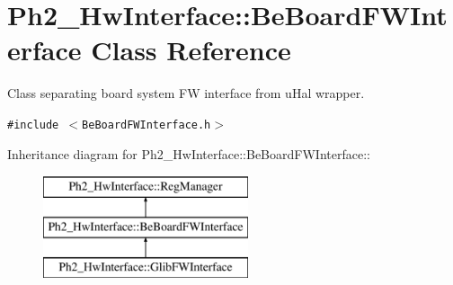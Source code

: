 \hypertarget{class_ph2___hw_interface_1_1_be_board_f_w_interface}{
\section{Ph2\_\-Hw\-Interface::Be\-Board\-FWInterface Class Reference}
\label{class_ph2___hw_interface_1_1_be_board_f_w_interface}
}
Class separating board system FW interface from u\-Hal wrapper.  


{\tt \#include $<$Be\-Board\-FWInterface.h$>$}

Inheritance diagram for Ph2\_\-Hw\-Interface::Be\-Board\-FWInterface::\begin{figure}[H]
\begin{center}
\leavevmode
\includegraphics[height=3cm]{class_ph2___hw_interface_1_1_be_board_f_w_interface}
\end{center}
\end{figure}
